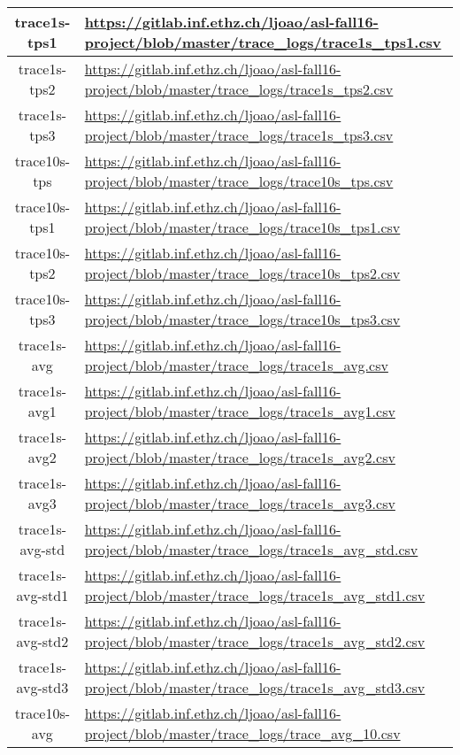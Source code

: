 \documentclass[11pt]{article}
\begin{document}
\begin{tabular}{|c|l|}
\hline trace1s-tps1 & \url{https://gitlab.inf.ethz.ch/ljoao/asl-fall16-project/blob/master/trace_logs/trace1s_tps1.csv} \\
\hline trace1s-tps2 & \url{https://gitlab.inf.ethz.ch/ljoao/asl-fall16-project/blob/master/trace_logs/trace1s_tps2.csv} \\
\hline trace1s-tps3 & \url{https://gitlab.inf.ethz.ch/ljoao/asl-fall16-project/blob/master/trace_logs/trace1s_tps3.csv} \\
\hline trace10s-tps & \url{https://gitlab.inf.ethz.ch/ljoao/asl-fall16-project/blob/master/trace_logs/trace10s_tps.csv} \\ 
\hline trace10s-tps1 & \url{https://gitlab.inf.ethz.ch/ljoao/asl-fall16-project/blob/master/trace_logs/trace10s_tps1.csv} \\ 
\hline trace10s-tps2 & \url{https://gitlab.inf.ethz.ch/ljoao/asl-fall16-project/blob/master/trace_logs/trace10s_tps2.csv} \\ 
\hline trace10s-tps3 & \url{https://gitlab.inf.ethz.ch/ljoao/asl-fall16-project/blob/master/trace_logs/trace10s_tps3.csv} \\ 
\hline trace1s-avg & \url{https://gitlab.inf.ethz.ch/ljoao/asl-fall16-project/blob/master/trace_logs/trace1s_avg.csv} \\
\hline trace1s-avg1 & \url{https://gitlab.inf.ethz.ch/ljoao/asl-fall16-project/blob/master/trace_logs/trace1s_avg1.csv} \\  
\hline trace1s-avg2 & \url{https://gitlab.inf.ethz.ch/ljoao/asl-fall16-project/blob/master/trace_logs/trace1s_avg2.csv} \\ 
\hline trace1s-avg3 & \url{https://gitlab.inf.ethz.ch/ljoao/asl-fall16-project/blob/master/trace_logs/trace1s_avg3.csv} \\ 
\hline trace1s-avg-std & \url{https://gitlab.inf.ethz.ch/ljoao/asl-fall16-project/blob/master/trace_logs/trace1s_avg_std.csv} \\ 
\hline trace1s-avg-std1 & \url{https://gitlab.inf.ethz.ch/ljoao/asl-fall16-project/blob/master/trace_logs/trace1s_avg_std1.csv} \\ 
\hline trace1s-avg-std2 & \url{https://gitlab.inf.ethz.ch/ljoao/asl-fall16-project/blob/master/trace_logs/trace1s_avg_std2.csv} \\ 
\hline trace1s-avg-std3 & \url{https://gitlab.inf.ethz.ch/ljoao/asl-fall16-project/blob/master/trace_logs/trace1s_avg_std3.csv} \\ 
\hline trace10s-avg & \url{https://gitlab.inf.ethz.ch/ljoao/asl-fall16-project/blob/master/trace_logs/trace_avg_10.csv} \\

\end{tabular}
\end{document}
